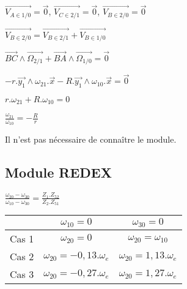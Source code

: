 $\overrightarrow{V_{A\in1/0}}=\vec{0}$, $\overrightarrow{V_{C\in2/1}}=\vec{0}$, $\overrightarrow{V_{B\in2/0}}=\vec{0}$

$\overrightarrow{V_{B\in2/0}}=\overrightarrow{V_{B\in2/1}}+\overrightarrow{V_{B\in1/0}}$

$\overrightarrow{BC}\wedge\overrightarrow{\Omega_{2/1}}+\overrightarrow{BA}\wedge\overrightarrow{\Omega_{1/0}}=\vec{0}$

$-r.\overrightarrow{y_1}\wedge\omega_{21}.\vec{x}-R.\overrightarrow{y_1}\wedge\omega_{10}.\vec{x}=\vec{0}$

$r.\omega_{21}+R.\omega_{10}=0$

$\frac{\omega_{21}}{\omega_{10}}=-\frac{R}{r}$

Il n'est pas nécessaire de connaître le module.

\setcounter{num_cor}{0}
\subsection{Module REDEX}

$\frac{\omega_{20}-\omega_{30}}{\omega_{10}-\omega_{30}}=\frac{Z_1.Z_{52}}{Z_2.Z_{51}}$

\begin{tabular}{|c|c|c|}
\hline
& $\omega_{10}=0$ & $\omega_{30}=0$ \\
\hline
Cas 1 & $\omega_{20}=0$ & $\omega_{20}=\omega_{10}$ \\
\hline
Cas 2 & $\omega_{20}=-0,13.\omega_e$ & $\omega_{20}=1,13.\omega_e$ \\
\hline
Cas 3 & $\omega_{20}=-0,27.\omega_e$ & $\omega_{20}=1,27.\omega_e$ \\
\hline
\end{tabular}



